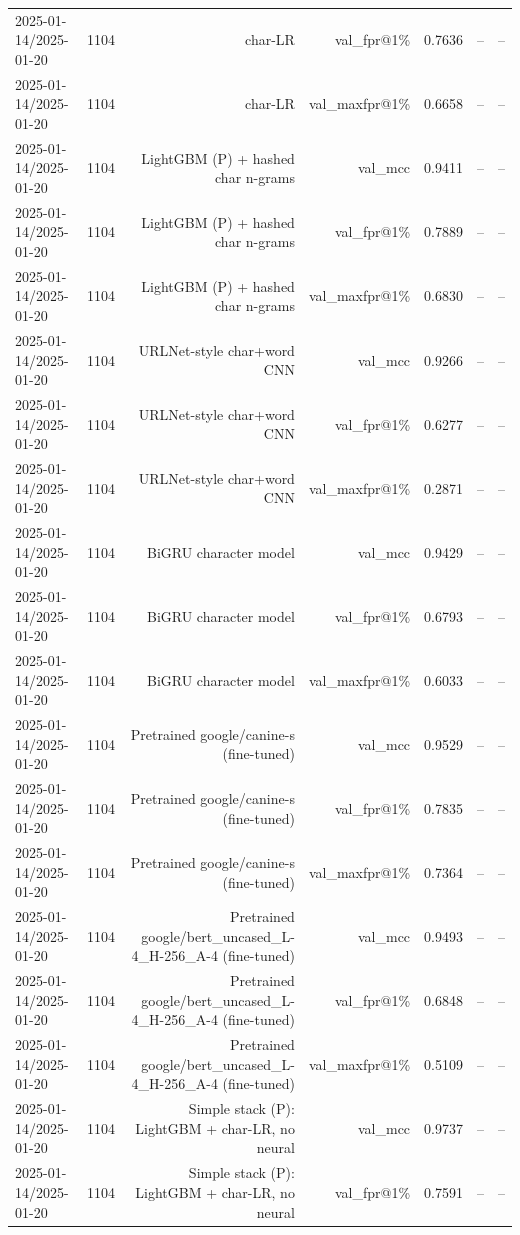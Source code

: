 \begin{table}[t]
\begin{tabular}{llrrrrr}
2025-01-14/2025-01-20 & 1104 & char-LR & val\_fpr@1\% & 0.7636 & -- & -- \\
2025-01-14/2025-01-20 & 1104 & char-LR & val\_maxfpr@1\% & 0.6658 & -- & -- \\
2025-01-14/2025-01-20 & 1104 & LightGBM (P) + hashed char n-grams & val\_mcc & 0.9411 & -- & -- \\
2025-01-14/2025-01-20 & 1104 & LightGBM (P) + hashed char n-grams & val\_fpr@1\% & 0.7889 & -- & -- \\
2025-01-14/2025-01-20 & 1104 & LightGBM (P) + hashed char n-grams & val\_maxfpr@1\% & 0.6830 & -- & -- \\
2025-01-14/2025-01-20 & 1104 & URLNet-style char+word CNN & val\_mcc & 0.9266 & -- & -- \\
2025-01-14/2025-01-20 & 1104 & URLNet-style char+word CNN & val\_fpr@1\% & 0.6277 & -- & -- \\
2025-01-14/2025-01-20 & 1104 & URLNet-style char+word CNN & val\_maxfpr@1\% & 0.2871 & -- & -- \\
2025-01-14/2025-01-20 & 1104 & BiGRU character model & val\_mcc & 0.9429 & -- & -- \\
2025-01-14/2025-01-20 & 1104 & BiGRU character model & val\_fpr@1\% & 0.6793 & -- & -- \\
2025-01-14/2025-01-20 & 1104 & BiGRU character model & val\_maxfpr@1\% & 0.6033 & -- & -- \\
2025-01-14/2025-01-20 & 1104 & Pretrained google/canine-s (fine-tuned) & val\_mcc & 0.9529 & -- & -- \\
2025-01-14/2025-01-20 & 1104 & Pretrained google/canine-s (fine-tuned) & val\_fpr@1\% & 0.7835 & -- & -- \\
2025-01-14/2025-01-20 & 1104 & Pretrained google/canine-s (fine-tuned) & val\_maxfpr@1\% & 0.7364 & -- & -- \\
2025-01-14/2025-01-20 & 1104 & Pretrained google/bert\_uncased\_L-4\_H-256\_A-4 (fine-tuned) & val\_mcc & 0.9493 & -- & -- \\
2025-01-14/2025-01-20 & 1104 & Pretrained google/bert\_uncased\_L-4\_H-256\_A-4 (fine-tuned) & val\_fpr@1\% & 0.6848 & -- & -- \\
2025-01-14/2025-01-20 & 1104 & Pretrained google/bert\_uncased\_L-4\_H-256\_A-4 (fine-tuned) & val\_maxfpr@1\% & 0.5109 & -- & -- \\
2025-01-14/2025-01-20 & 1104 & Simple stack (P): LightGBM + char-LR, no neural & val\_mcc & 0.9737 & -- & -- \\
2025-01-14/2025-01-20 & 1104 & Simple stack (P): LightGBM + char-LR, no neural & val\_fpr@1\% & 0.7591 & -- & -- \\

\end{tabular}
\end{table}
